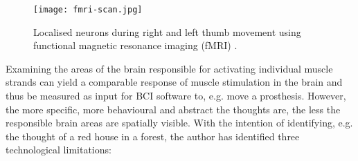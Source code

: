 \begin{figure}[ht]
  \centering
  \texttt{[image: fmri-scan.jpg]}
  \caption[Localised neurons during right and left thumb movement using functional magnetic resonance imaging (fMRI)]{Localised neurons during right and left thumb movement using functional magnetic resonance imaging (fMRI) \citep{rashid_bilateral_2018}.}
  \label{fig:fmri-scan}
\end{figure}

Examining the areas of the brain responsible for activating individual muscle strands can yield a comparable response of muscle stimulation in the brain and thus be measured as input for BCI software to, e.g. move a prosthesis. However, the more specific, more behavioural and abstract the thoughts are, the less the responsible brain areas are spatially visible. With the intention of identifying, e.g. the thought of a red house in a forest, the author has identified three technological limitations:

